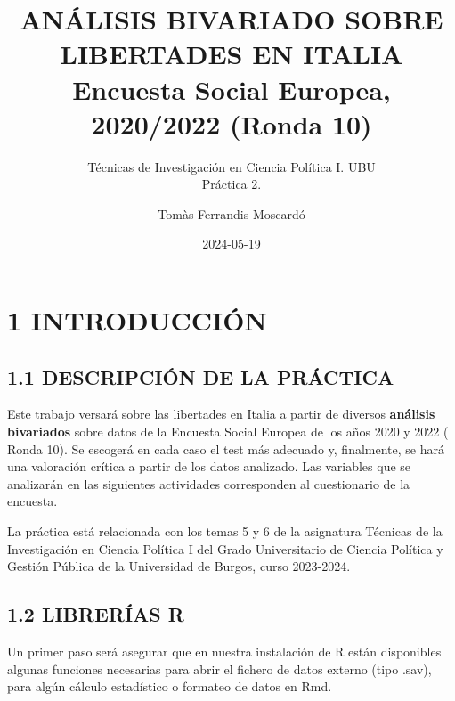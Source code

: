 \documentclass[
  12 pt,
  a4paper,
]{article}
\title{ANÁLISIS BIVARIADO SOBRE LIBERTADES EN ITALIA\\
Encuesta Social Europea, 2020/2022 (Ronda 10)}
\subtitle{Técnicas de Investigación en Ciencia Política I. UBU\\
Práctica 2.}
\author{Tomàs Ferrandis Moscardó}
\date{2024-05-19}
\begin{document}
\maketitle

{
\setcounter{tocdepth}{2}
\tableofcontents
}
\newpage
\renewcommand\tablename{Tabla}

\section{1 INTRODUCCIÓN}\label{introducciuxf3n}

\subsection{1.1 DESCRIPCIÓN DE LA
PRÁCTICA}\label{descripciuxf3n-de-la-pruxe1ctica}

Este trabajo versará sobre las libertades en Italia a partir de diversos
\textbf{análisis bivariados} sobre datos de la Encuesta Social Europea
de los años 2020 y 2022 ( Ronda 10). Se escogerá en cada caso el test
más adecuado y, finalmente, se hará una valoración crítica a partir de
los datos analizado. Las variables que se analizarán en las siguientes
actividades corresponden al cuestionario de la encuesta.

La práctica está relacionada con los temas 5 y 6 de la asignatura
Técnicas de la Investigación en Ciencia Política I del Grado
Universitario de Ciencia Política y Gestión Pública de la Universidad de
Burgos, curso 2023-2024.

\subsection{1.2 LIBRERÍAS R}\label{libreruxedas-r}

Un primer paso será asegurar que en nuestra instalación de R están
disponibles algunas funciones necesarias para abrir el fichero de datos
externo (tipo .sav), para algún cálculo estadístico o formateo de datos
en Rmd.
\end{document}

